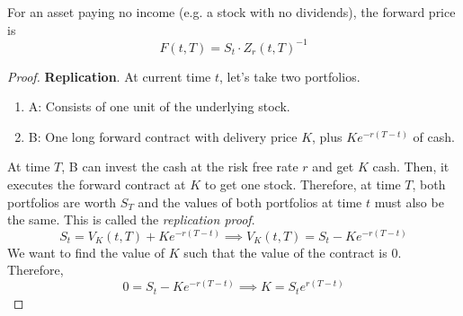 \documentclass{article}
\begin{document}
    \begin{theorem}
      For an asset paying no income (e.g. a stock with no dividends), the forward price is 
      \begin{equation}
        F(t, T) = S_t \cdot Z_r (t, T)^{-1}
      \end{equation} 
    \end{theorem}
    \begin{proof}
      \textbf{Replication}. At current time $t$, let's take two portfolios. 
      \begin{enumerate}
        \item A: Consists of one unit of the underlying stock. 
        \item B: One long forward contract with delivery price $K$, plus $K e^{-r(T - t)}$ of cash. 
      \end{enumerate}
      At time $T$, B can invest the cash at the risk free rate $r$ and get $K$ cash. Then, it executes the forward contract at $K$ to get one stock. Therefore, at time $T$, both portfolios are worth $S_T$ and the values of both portfolios at time $t$ must also be the same. This is called the \textit{replication proof}. 
      \begin{equation}
        S_t = V_K (t, T) + K e^{-r (T - t)} \implies V_K (t, T)= S_t - K e^{-r (T - t)}
      \end{equation}
      We want to find the value of $K$ such that the value of the contract is $0$. Therefore, 
      \begin{equation}
        0 = S_t - K e^{-r (T - t)} \implies K = S_t e^{r (T - t)}
      \end{equation}
    \end{proof}
\end{document}
